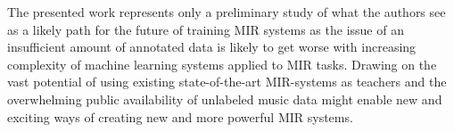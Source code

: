 \documentclass{article}
\begin{document}
The presented work represents only a preliminary study of what the authors see as a likely path for the future of training MIR systems as the issue of an insufficient amount of annotated data is likely to get worse with increasing complexity of machine learning systems applied to MIR tasks. Drawing on the vast potential of using existing state-of-the-art MIR-systems as teachers and the overwhelming public availability of unlabeled music data might enable new and exciting ways of creating new and more powerful MIR systems. %


\end{document}
